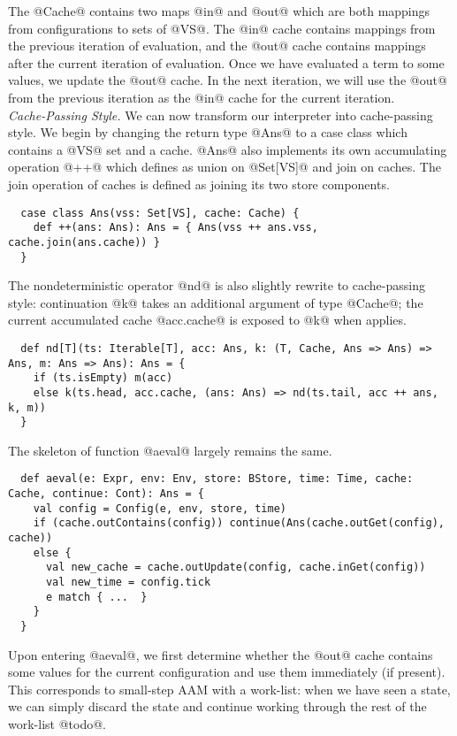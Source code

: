 \documentclass[acmsmall, review]{acmart}\settopmatter{}
\begin{document}
The @Cache@ contains two maps @in@ and @out@ which are both mappings from configurations 
to sets of @VS@. The @in@ cache contains mappings from the previous iteration of evaluation, 
and the @out@ cache contains mappings after the current iteration of evaluation. 
Once we have evaluated a term to some values, we update the @out@ cache. In the next 
iteration, we will use the @out@ from the previous iteration as the @in@ cache for the 
current iteration. \\

\textit{Cache-Passing Style.}
We can now transform our interpreter into cache-passing style. We begin by changing the 
return type @Ans@ to a case class which contains a @VS@ set and a cache. @Ans@ also implements 
its own accumulating operation @++@ which defines as union on @Set[VS]@ and join on caches.
The join operation of caches is defined as joining its two store components.

\begin{lstlisting}
  case class Ans(vss: Set[VS], cache: Cache) {
    def ++(ans: Ans): Ans = { Ans(vss ++ ans.vss, cache.join(ans.cache)) }
  }
\end{lstlisting}

The nondeterministic operator @nd@ is also slightly rewrite to cache-passing style:
continuation @k@ takes an additional argument of type @Cache@; the current accumulated
cache @acc.cache@ is exposed to @k@ when applies.

\begin{lstlisting}
  def nd[T](ts: Iterable[T], acc: Ans, k: (T, Cache, Ans => Ans) => Ans, m: Ans => Ans): Ans = {
    if (ts.isEmpty) m(acc)
    else k(ts.head, acc.cache, (ans: Ans) => nd(ts.tail, acc ++ ans, k, m))
  }
\end{lstlisting}

The skeleton of function @aeval@ largely remains the same. 

\begin{lstlisting}
  def aeval(e: Expr, env: Env, store: BStore, time: Time, cache: Cache, continue: Cont): Ans = {
    val config = Config(e, env, store, time)
    if (cache.outContains(config)) continue(Ans(cache.outGet(config), cache))
    else {
      val new_cache = cache.outUpdate(config, cache.inGet(config))
      val new_time = config.tick 
      e match { ...  }
    }
  }
\end{lstlisting}

Upon entering @aeval@, we first determine whether the @out@ cache
contains some values for the current configuration and use them immediately (if present).
This corresponds to small-step AAM with a work-list: when we have seen a state,
we can simply discard the state and continue working through the rest of the work-list @todo@.
\end{document}
